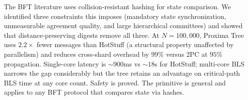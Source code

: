 \documentclass[conference]{IEEEtran}
\begin{document}
The BFT literature uses collision-resistant hashing for state comparison. We identified three constraints this imposes (mandatory state synchronization, unmeasurable agreement quality, and large hierarchical committees) and showed that distance-preserving digests remove all three. At $N{=}100{,}000$, Proxima Tree uses $2.2\times$ fewer messages than HotStuff (a structural property unaffected by parallelism) and reduces cross-shard overhead by $99\%$ versus 2PC at $95\%$ propagation. Single-core latency is $\sim\!900$ms vs $\sim\!18$s for HotStuff; multi-core BLS narrows the gap considerably but the tree retains an advantage on critical-path BLS time at any core count. Safety is proved. The primitive is general and applies to any BFT protocol that compares state via hashes.

\end{document}
